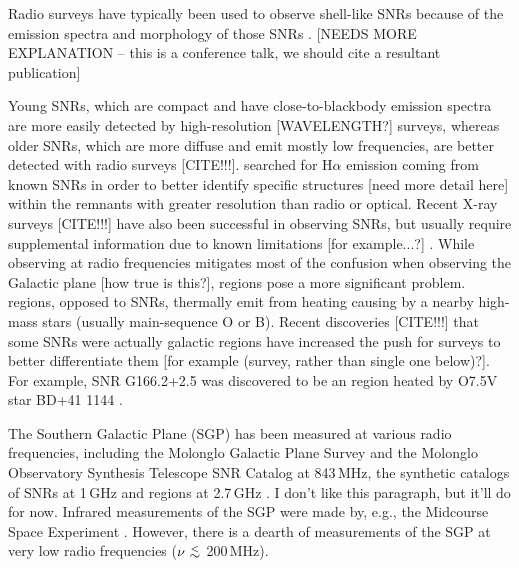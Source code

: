 \documentclass[preprint2,epsf,epsfig,graphics]{emulateapj}
\newcommand {\aplt} {\ {\raise-.5ex\hbox{$\buildrel<\over\sim$}}\ }
\begin{document}
Radio surveys have typically been used to observe shell-like SNRs %
because of the emission spectra and morphology of those SNRs \citep{Bandiera.01}.  {\color{red}[NEEDS MORE EXPLANATION -- this is a conference talk, we should cite a resultant publication]}

Young SNRs, which are compact and have close-to-blackbody emission spectra are more easily detected by high-resolution {\color{red}[WAVELENGTH?]} surveys, whereas older SNRs, which are more diffuse and emit mostly low frequencies, are better detected with radio surveys {\color{red}[CITE!!!]}. \cite{Stupar_cat.11} searched for H$\alpha$ emission coming from known SNRs in order to better identify specific structures {\color{red}[need more detail here]} within the remnants with greater resolution than radio or optical.  Recent X-ray surveys {\color{red}[CITE!!!]} have also been successful in observing SNRs, but usually require supplemental information due to known limitations {\color{red}[for example...?]} \citep{Bandiera.01}. While observing at radio frequencies mitigates most of the confusion when observing the Galactic plane {\color{red}[how true is this?]},  regions pose a more significant problem.   regions, opposed to SNRs, thermally emit from heating causing by a nearby high-mass stars (usually main-sequence O or B).  Recent discoveries {\color{red}[CITE!!!]} that some SNRs were actually galactic  regions have increased the push for surveys to better differentiate them {\color{red}[for example (survey, rather than single one below)?]}.  For example, SNR G166.2+2.5 was discovered to be an  region heated by O7.5V star BD+41 1144 \citep{Foster.06}.  

The Southern Galactic Plane (SGP) has been measured at various radio frequencies, including the Molonglo Galactic Plane Survey \citep[MGPS][]{Murphy.07} and the Molonglo Observatory Synthesis Telescope SNR Catalog \citep[MOSTSNRCAT][]{Whiteoak.96} at 843\,MHz, the synthetic catalogs of SNRs at 1\,GHz \citep{DAGreen.14} and  regions at 2.7\,GHz \citep{Paladini.03}. {\color{red} I don't like this paragraph, but it'll do for now.} Infrared measurements of the SGP were made by, e.g., the Midcourse Space Experiment \citep[MSX][operating at 8.28--21.3\,$\mu$m (36.23--14.08\,THz)]{Egan.03}. However, there is a dearth of measurements of the SGP at very low radio frequencies ($\nu\aplt$200\,MHz).
\end{document}
